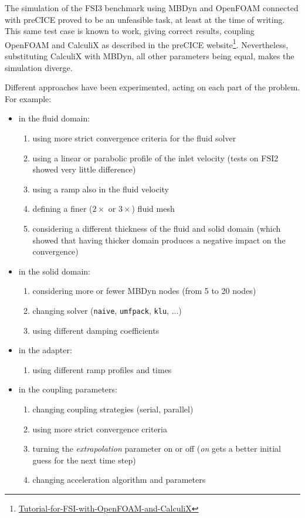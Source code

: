 The simulation of the FSI3 benchmark using MBDyn and OpenFOAM connected with preCICE proved to be an unfeasible task, at least at the time of writing. This same test case is known to work, giving correct results, coupling OpenFOAM and CalculiX as described in the preCICE website\footnote{\href{https://github.com/precice/precice/wiki/Tutorial-for-FSI-with-OpenFOAM-and-CalculiX}{Tutorial-for-FSI-with-OpenFOAM-and-CalculiX}}.
Nevertheless, substituting CalculiX with MBDyn, all other parameters being equal, makes the simulation diverge.

Different approaches have been experimented, acting on each part of the problem. For example:

\begin{itemize}
	\item in the fluid domain:
	\begin{enumerate}
		\item using more strict convergence criteria for the fluid solver
		\item using a linear or parabolic profile of the inlet velocity (tests on FSI2 showed very little difference)
		\item using a ramp also in the fluid velocity
		\item defining a finer ($2\times$ or $3\times$) fluid mesh
		\item considering a different thickness of the fluid and solid domain (which showed that having thicker domain produces a negative impact on the convergence)
	\end{enumerate}
	\item in the solid domain:
	\begin{enumerate}
		\item considering more or fewer MBDyn nodes (from 5 to 20 nodes)
		\item changing solver (\texttt{naive}, \texttt{umfpack}, \texttt{klu}, $\ldots$)
		\item using different damping coefficients
	\end{enumerate}
	\item in the adapter:
	\begin{enumerate}
		\item using different ramp profiles and times
	\end{enumerate}
	\item in the coupling parameters:
	\begin{enumerate}
		\item changing coupling strategies (serial, parallel)
		\item using more strict convergence criteria
		\item turning the \textit{extrapolation} parameter on  or off (\textit{on} gets a better initial guess for the next time step)
		\item changing acceleration algorithm and parameters
	\end{enumerate}
\end{itemize}

